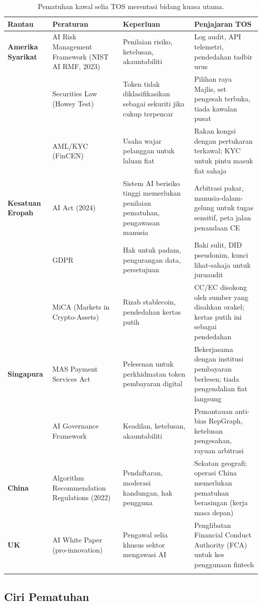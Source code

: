 \documentclass[11pt]{article}
\begin{document}
\begin{longtable}{@{}p{}p{}p{}p{}@{}}
\toprule
\textbf{Rantau} & \textbf{Peraturan} & \textbf{Keperluan} & \textbf{Penjajaran TOS} \\\midrule
\textbf{Amerika Syarikat} & AI Risk Management Framework (NIST AI RMF, 2023) & Penilaian risiko, ketelusan, akauntabiliti & Log audit, API telemetri, pendedahan tadbir urus \\
 & Securities Law (Howey Test) & Token tidak diklasifikasikan sebagai sekuriti jika cukup terpencar & Pilihan raya Majlis, set pengesah terbuka, tiada kawalan pusat \\
 & AML/KYC (FinCEN) & Usaha wajar pelanggan untuk laluan fiat & Rakan kongsi dengan pertukaran terkawal; KYC untuk pintu masuk fiat sahaja \\
\textbf{Kesatuan Eropah} & AI Act (2024) & Sistem AI berisiko tinggi memerlukan penilaian pematuhan, pengawasan manusia & Arbitrasi pakar, manusia-dalam-gelung untuk tugas sensitif, peta jalan penandaan CE \\
 & GDPR & Hak untuk padam, pengurangan data, persetujuan & Baki sulit, DID pseudonim, kunci lihat-sahaja untuk juruaudit \\
 & MiCA (Markets in Crypto-Assets) & Rizab stablecoin, pendedahan kertas putih & CC/EC disokong oleh sumber yang disahkan orakel; kertas putih ini sebagai pendedahan \\
\textbf{Singapura} & MAS Payment Services Act & Pelesenan untuk perkhidmatan token pembayaran digital & Bekerjasama dengan institusi pembayaran berlesen; tiada pengendalian fiat langsung \\
 & AI Governance Framework & Keadilan, ketelusan, akauntabiliti & Pemantauan anti-bias RepGraph, ketelusan pengesahan, rayuan arbitrasi \\
\textbf{China} & Algorithm Recommendation Regulations (2022) & Pendaftaran, moderasi kandungan, hak pengguna & Sekatan geografi; operasi China memerlukan pematuhan berasingan (kerja masa depan) \\
\textbf{UK} & AI White Paper (pro-innovation) & Pengawal selia khusus sektor mengawasi AI & Penglibatan Financial Conduct Authority (FCA) untuk kes penggunaan fintech \\
\bottomrule
\caption{Pematuhan kawal selia TOS merentasi bidang kuasa utama.}
\end{longtable}

\subsection{Ciri Pematuhan}
\end{document}
